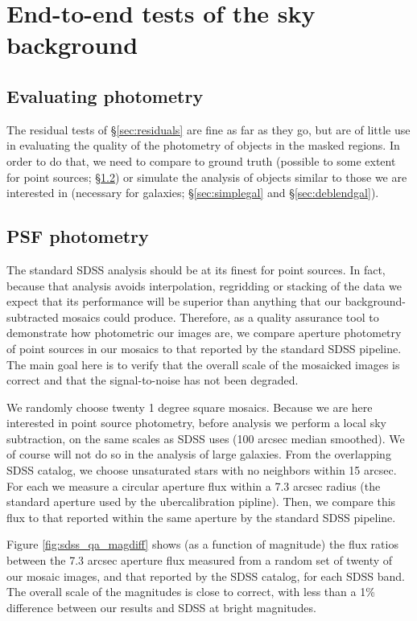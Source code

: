 \documentclass[10pt,preprint]{aastex}
\begin{document}
\section{End-to-end tests of the sky background}
\label{sec:endtoend}

\subsection{Evaluating photometry}
\label{sec:e2eintro}

The residual tests of \S\ref{sec:residuals} are fine as far as they go,
but are of little use in evaluating the quality of the photometry of
objects in the masked regions.  In order to do that, we need to
compare to ground truth (possible to some extent for point sources;
\S\ref{sec:psfs}) or simulate the analysis of objects similar to
those we are interested in (necessary for galaxies;
\S\ref{sec:simplegal} and \S\ref{sec:deblendgal}).

\subsection{PSF photometry}
\label{sec:psfs}

The standard SDSS analysis should be at its finest for point sources.
In fact, because that analysis avoids interpolation, regridding or
stacking of the data we expect that its performance will be superior
than anything that our background-subtracted mosaics could
produce. Therefore, as a quality assurance tool to demonstrate how
photometric our images are, we compare aperture photometry of point
sources in our mosaics to that reported by the standard SDSS
pipeline. The main goal here is to verify that the overall scale of
the mosaicked images is correct and that the signal-to-noise has not
been degraded.

We randomly choose twenty 1 degree square mosaics. Because we are here
interested in point source photometry, before analysis we perform a
local sky subtraction, on the same scales as SDSS uses (100 arcsec
median smoothed).  We of course will not do so in the analysis of
large galaxies. From the overlapping SDSS catalog, we choose
unsaturated stars with no neighbors within 15 arcsec.  For each we
measure a circular aperture flux within a 7.3 arcsec radius (the
standard aperture used by the ubercalibration pipline).  Then, we
compare this flux to that reported within the same aperture by the
standard SDSS pipeline.

Figure \ref{fig:sdss_qa_magdiff} shows (as a function of magnitude)
the flux ratios between the 7.3 arcsec aperture flux measured from a
random set of twenty of our mosaic images, and that reported by the
SDSS catalog, for each SDSS band. The overall scale of the magnitudes
is close to correct, with less than a 1\% difference between our
results and SDSS at bright magnitudes.
\end{document}
